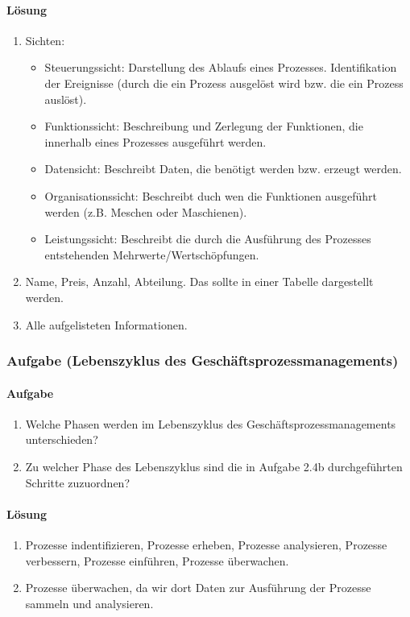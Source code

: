 \paragraph*{Lösung}
    \begin{enumerate}[label=\alph*)]
        \item Sichten:
        \begin{itemize}
            \item Steuerungssicht: Darstellung des Ablaufs eines Prozesses. Identifikation der Ereignisse (durch die ein Prozess ausgelöst wird bzw. die ein Prozess auslöst).
            \item Funktionssicht: Beschreibung und Zerlegung der Funktionen, die innerhalb eines Prozesses ausgeführt werden.
            \item Datensicht: Beschreibt Daten, die benötigt werden bzw. erzeugt werden.
            \item Organisationssicht: Beschreibt duch wen die Funktionen ausgeführt werden (z.B. Meschen oder Maschienen).
            \item Leistungssicht: Beschreibt die durch die Ausführung des Prozesses entstehenden Mehrwerte/Wertschöpfungen.
        \end{itemize}
        \item Name, Preis, Anzahl, Abteilung. Das sollte in einer Tabelle dargestellt werden.
        \item Alle aufgelisteten Informationen.
    \end{enumerate}


\subsubsection*{Aufgabe (Lebenszyklus des Geschäftsprozessmanagements)}
\paragraph*{Aufgabe}
    \begin{enumerate}[label=\alph*)]
        \item Welche Phasen werden im Lebenszyklus des Geschäftsprozessmanagements unterschieden?
        \item Zu welcher Phase des Lebenszyklus sind die in Aufgabe 2.4b durchgeführten Schritte zuzuordnen?
    \end{enumerate}
   
\paragraph*{Lösung}
    \begin{enumerate}[label=\alph*)]
        \item Prozesse indentifizieren, Prozesse erheben, Prozesse analysieren, Prozesse verbessern, Prozesse einführen, Prozesse überwachen.
        \item Prozesse überwachen, da wir dort Daten zur Ausführung der Prozesse sammeln und analysieren.
    \end{enumerate}


